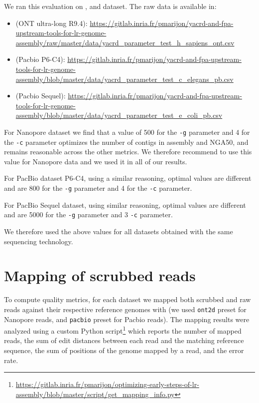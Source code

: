 \documentclass[../../main.tex]{subfiles}
\begin{document}
We ran this evaluation on \hsapiens, \celegans and \ecolipb dataset. The raw data is available in:
\begin{itemize}
    \item \hsapiens (ONT ultra-long R9.4): \url{https://gitlab.inria.fr/pmarijon/yacrd-and-fpa-upstream-tools-for-lr-genome-assembly/raw/master/data/yacrd_parameter_test_h_sapiens_ont.csv}
    \item \celegans (Pacbio P6-C4): \url{https://gitlab.inria.fr/pmarijon/yacrd-and-fpa-upstream-tools-for-lr-genome-assembly/blob/master/data/yacrd_parameter_test_c_elegans_pb.csv}
    \item \ecoli (Pacbio Sequel): \url{https://gitlab.inria.fr/pmarijon/yacrd-and-fpa-upstream-tools-for-lr-genome-assembly/blob/master/data/yacrd_parameter_test_e_coli_pb.csv}
\end{itemize}

For \hsapiens Nanopore dataset we find that a value of 500 for the \texttt{-g} parameter and 4 for the \texttt{-c} parameter optimizes the number of contigs in \miniasm assembly and NGA50, and remains reasonable across the other metrics. We therefore recommend to use this value for Nanopore data and we used it in all of our results.

For \celegans PacBio dataset P6-C4, using a similar reasoning, optimal values are different and are 800 for the \texttt{-g} parameter and 4 for the \texttt{-c} parameter.

For \ecoli PacBio Sequel dataset, using similar reasoning, optimal values are different and are 5000 for the \texttt{-g} parameter and 3 \texttt{-c} parameter.

We therefore used the above values for all datasets obtained with the same sequencing technology.


\newpage
\section{Mapping of scrubbed reads}\label{appendix:result_scrubbed_reads}

To compute quality metrics, for each dataset we mapped both scrubbed and raw reads against their respective  reference genomes with \bwa (we used \texttt{ont2d} preset for Nanopore reads, and \texttt{pacbio} preset for Pacbio reads). The mapping results were analyzed using a custom Python script\footnote{\url{https://gitlab.inria.fr/pmarijon/optimizing-early-steps-of-lr-assembly/blob/master/script/get_mapping_info.py}} which reports the number of mapped reads, the sum of edit distances between each read and the matching reference sequence, the sum of positions of the genome mapped by a read, and the error rate.
\end{document}
